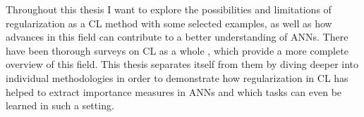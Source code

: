 Throughout this thesis I want to explore the possibilities and limitations of regularization as a CL method with some selected examples, as well as how advances in this field can contribute to a better understanding of ANNs. There have been thorough surveys on CL as a whole \cite{LW, verwimp2024continuallearningapplicationsroad, bidaki2025}, which provide a more complete overview of this field. This thesis separates itself from them by diving deeper into individual methodologies in order to demonstrate how regularization in CL has helped to extract importance measures in ANNs and which tasks can even be learned in such a setting.